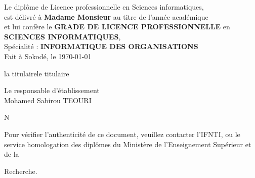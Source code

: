 \documentclass[a4paper, landscape, 10pt]{article}
\begin{document}
\noindent
Le diplôme de Licence professionnelle en Sciences informatiques,\\
est délivré à \textbf{Madame Monsieur  } au titre de l'année académique \\
et lui confère le \textbf{GRADE DE LICENCE PROFESSIONNELLE} en \textbf{SCIENCES INFORMATIQUES},\\
Spécialité : \textbf{INFORMATIQUE DES ORGANISATIONS}\\

Fait à Sokodé, le \today \\

\vspace{0.5cm}


\noindent
\begin{minipage}{0.49\textwidth}
	\begin{center}
		la titulairele titulaire\\
		\vspace{2cm}
		 
	\end{center}
\end{minipage}\hfill
\begin{minipage}{0.49\textwidth}
	\begin{center}
		Le responsable d'établissement\\
		\vspace{2cm}
		Mohamed Sabirou TEOURI
	\end{center}
\end{minipage}

\vspace{1.5cm}
\noindent
N\textdegree {}


\newpage


\vspace*{5cm}
\begin{center}
	\begin{minipage}{25cm}
		Pour vérifier l’authenticité de ce document, veuillez contacter l’IFNTI,
	ou le service homologation des diplômes du Ministère de l’Enseignement Supérieur et de la
	\end{minipage}
\end{center}
\vspace*{-0.7cm}
\begin{center}
	\begin{minipage}{25cm}
		\hspace{11.3cm}Recherche.
	\end{minipage}
\end{center}


\begin{center}
	
	
\end{center}
\end{document}

